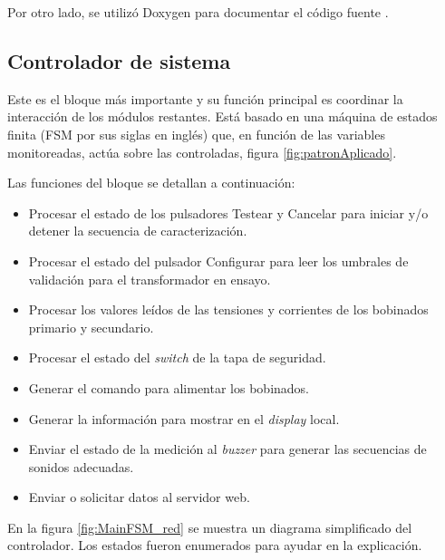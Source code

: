 Por otro lado, se utilizó Doxygen para documentar el código fuente \citep{DOXYGEN}.

\subsection{Controlador de sistema}

Este es el bloque más importante y su función principal es coordinar la interacción de los módulos restantes. Está basado en una máquina de estados finita (FSM por sus siglas en inglés) que, en función de las variables monitoreadas, actúa sobre las controladas, figura \ref{fig:patronAplicado}.

Las funciones del bloque se detallan a continuación:

\begin{itemize}
\item Procesar el estado de los pulsadores Testear y Cancelar para iniciar y/o detener la secuencia de caracterización.
\item Procesar el estado del pulsador Configurar para leer los umbrales de validación para el transformador en ensayo.
\item Procesar los valores leídos de las tensiones y corrientes de los bobinados primario y secundario.
\item Procesar el estado del \textit{switch} de la tapa de seguridad.
\item Generar el comando para alimentar los bobinados.
\item Generar la información para mostrar en el \textit{display} local.
\item Enviar el estado de la medición al \textit{buzzer} para generar las secuencias de sonidos adecuadas.
\item Enviar o solicitar datos al servidor web.
\end{itemize}

En la figura \ref{fig:MainFSM_red} se muestra un diagrama simplificado del controlador. Los estados fueron enumerados para ayudar en la explicación.

